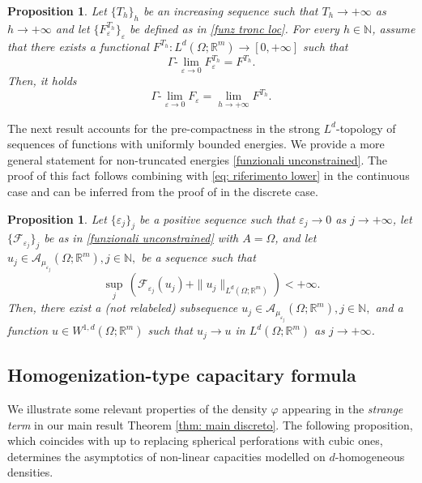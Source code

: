 \documentclass{article}
\theoremstyle{plain}
\newtheorem{proposition}[theorem]{Proposition}
\theoremstyle{definition}
\def\e{\varepsilon}
\def\rr{{\mathbb R}}
\def\NN{{\mathbb N}}
\newcommand{\f}{\varphi}
\newcommand{\ej}{\varepsilon_j}
\newcommand{\A}{\mathcal{A}}
\newcommand{\F}{\mathcal{F}}
\numberwithin{equation}{section}
\begin{document}
\begin{proposition}\label{proposition: gamma_troncamento} Let $\{T_h\}_h$ be an increasing sequence such that $T_h\to+\infty$ as $h\to+\infty$ and let $\{F^{T_h}_\e\}_\e$ be defined as in \eqref{funz tronc loc}. For every $h\in\NN$, assume that there exists a functional $F^{T_h}:L^d(\Omega;\mathbb{R}^{m})\rightarrow [0,+\infty]$ such that
\begin{equation*}
     \Gamma\text{-}\lim_{\e\to0} F^{T_h}_{\e}= F^{T_h}.
\end{equation*}
 Then, it holds
\begin{equation*}
    \Gamma\text{-}\lim_{\e\to0} F_{\e}=\lim_{h\to+\infty} F^{T_h}.
\end{equation*}
\end{proposition}

The next result accounts for the pre-compactness in the strong $L^d$-topology of sequences of functions with uniformly bounded energies. We provide a more general statement for non-truncated energies \eqref{funzionali unconstrained}. The proof of this fact follows combining \cite[Theorem 4.2]{AABPT} with \eqref{eq: riferimento lower} in the continuous case and can be inferred from the proof of \cite[Corollary 3.11]{AliCic} in the discrete case.  

\begin{proposition}\label{prop: compactness} Let $\{\ej\}_j$ be a positive sequence such that $\ej\to0$ as $j\to+\infty$, let $\{\F_{\ej}\}_j$ be as in \eqref{funzionali unconstrained} with $A=\Omega$, and let $u_j\in\A_{\mu_{\ej}}(\Omega;\rr^m), j\in\NN,$ be a sequence such that
\begin{equation*}
    \sup_j\,(\F_{\ej}(u_j)+\|u_j\|_{L^d(\Omega; \rr^m)})<+\infty.
\end{equation*}
Then, there exist a (not relabeled) subsequence $u_j\in\A_{\mu_{\ej}}(\Omega;\rr^m), j\in\NN,$ and a function $u\in W^{1,d}(\Omega;\rr^m)$ such that $u_j\to u$ in $L^d(\Omega; \rr^m)$ as $j\to+\infty$. 
\end{proposition}

\subsection{Homogenization-type capacitary formula}

We illustrate some relevant properties of the density $\f$ appearing in the {\it strange term} in our main result Theorem \ref{thm: main discreto}. The following proposition, which coincides with \cite[Proposition 5.1]{Sig-cont} up to replacing spherical perforations with cubic ones, determines the asymptotics of non-linear capacities modelled on $d$-homogeneous densities.
\end{document}
